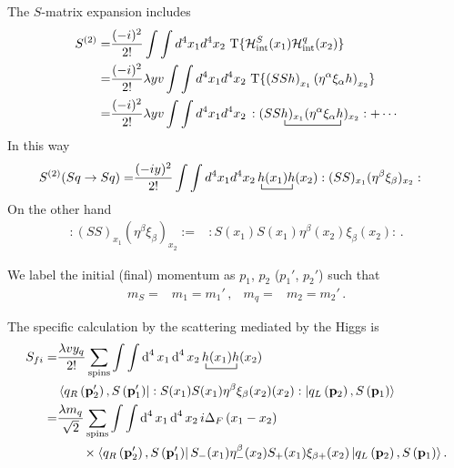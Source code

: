 The $S$-matrix expansion includes
\begin{align}
S^{(2)}=&  \frac{(-i)^2}{2!}\int\int d^4x_1 d^4x_2\,\operatorname{T}\{\mathcal{H}_{\text{int}}^S(x_1)\mathcal{H}_{\text{int}}^q(x_2)\}\nonumber\\
=&  \frac{(-i)^2}{2!}\lambda y v\int\int d^4x_1 d^4x_2\,\operatorname{T}\{\left(S S h \right)_{x_1} \left( \eta^{\alpha} \xi_{\alpha}h \right)_{x_2}\}\nonumber\\
=& 
 \frac{(-i)^2}{2!}\lambda y v\int\int d^4x_1 d^4x_2\,:( S
\bcontraction{S}{h}{)_{x_1}(\eta^{\alpha} \xi_{\alpha}}{h}
S h)_{x_1}(\eta^{\alpha} \xi_{\alpha}h
)_{x_2}:+\cdots
\end{align}
In this way
\begin{align}
  S^{(2)}(S q\to S q)=&\frac{(-iy)^2}{2!}\int\int d^4x_1 d^4x_2
\bcontraction{\,}{h}{(x_1)}{h}
\,h(x_1)h(x_2):(SS)_{x_1}(\eta^{\beta} \xi_{\beta})_{x_2}:
\end{align}
On the other hand 
\begin{align}
\label{eq:ss156f}
  :(SS)_{x_1}(\eta^{\beta} \xi_{\beta})_{x_2}:=&
:S(x_1) S(x_1) \eta^{\beta}(x_2) \xi_{\beta}(x_2):\,.
\end{align}



We label the initial (final) momentum as $p_1$, $p_2$ ($p_1'$, $p_2'$) such that
\begin{align}
  m_S=&m_1=m_1'\,,&m_q=&m_2=m_2'\,.
\end{align}


The specific calculation by the scattering mediated by the Higgs is 
\begin{align}
  \label{eq:ss32}
  S_{fi}=&\frac{\lambda  v y_q }{2!}\sum_{\text{spins}}\int\int \operatorname{d}^4x_1 \operatorname{d}^4x_2
\bcontraction{\,}{h}{(x_1)}{h}\,h(x_1)h(x_2) \nonumber\\
&\left\langle q_R \left(\mathbf{p}'_2\right),S\left(\mathbf{p}'_1\right) \right|
  : S(x_1)S(x_1)
    \eta^{\beta}\xi_{\beta}(x_2)(x_2):
 \left| q_L\left(\mathbf{p}_2\right) ,S \left(\mathbf{p}_1\right)  \right\rangle \nonumber\\
=&\frac{ \lambda  m_q }{\sqrt{2}}\sum_{\text{spins}}\int\int \operatorname{d}^4x_1 \operatorname{d}^4x_2
\,i\Delta_F \left( x_1-x_2 \right)\nonumber\\
&\qquad\times\left\langle q_R \left(\mathbf{p}'_2\right),S\left(\mathbf{p}'_1\right)\right|
   S_-(x_1)\eta^{\beta}_{-}(x_2) S_+(x_1)\xi_{\beta +}(x_2)
 \left| q_L\left(\mathbf{p}_2\right), S \left(\mathbf{p}_1\right)\right\rangle. 
\end{align}


